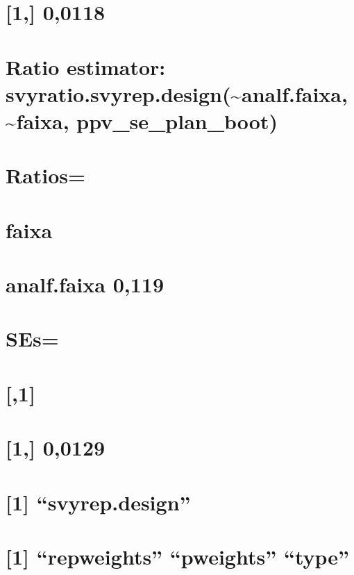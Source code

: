 \documentclass[]{book}
\theoremstyle{definition}
\theoremstyle{definition}
\theoremstyle{definition}
\theoremstyle{remark}
\begin{document}
\section{{[}1,{]} 0,0118}\label{section-2}

\section{Ratio estimator:
svyratio.svyrep.design(\textasciitilde{}analf.faixa,
\textasciitilde{}faixa,
ppv\_se\_plan\_boot)}\label{ratio-estimator-svyratio.svyrep.designanalf.faixa-faixa-ppv_se_plan_boot}

\section{Ratios=}\label{ratios-2}

\section{faixa}\label{faixa-4}

\section{analf.faixa 0,119}\label{analf.faixa-0119-2}

\section{SEs=}\label{ses-2}

\section{{[},1{]}}\label{section-3}

\section{{[}1,{]} 0,0129}\label{section-4}

\section{\texorpdfstring{{[}1{]}
``svyrep.design''}{{[}1{]} svyrep.design}}\label{svyrep.design}

\section{\texorpdfstring{{[}1{]} ``repweights'' ``pweights''
``type''}{{[}1{]} repweights pweights type}}\label{repweights-pweights-type}
\end{document}
